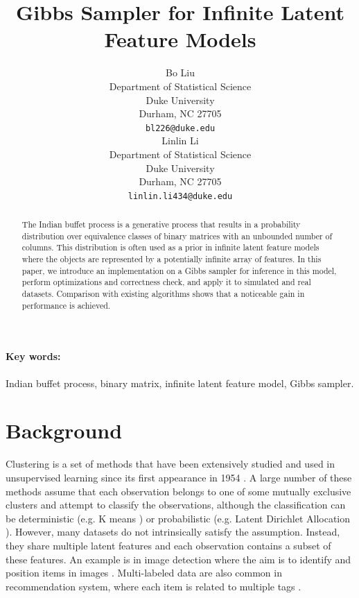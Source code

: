 \documentclass{article}
\title{Gibbs Sampler for Infinite Latent Feature Models}
\author{%
  Bo Liu \\
  Department of Statistical Science\\
  Duke University\\
  Durham, NC 27705 \\
  \texttt{bl226@duke.edu} \\
  \And
  Linlin Li \\
  Department of Statistical Science\\
  Duke University\\
  Durham, NC 27705 \\
  \texttt{linlin.li434@duke.edu} \\
}
\begin{document}
\maketitle

\begin{abstract}
  The Indian buffet process is a generative process that results in a probability distribution over equivalence classes of binary matrices with an unbounded number of columns. This distribution is often used as a prior in infinite latent feature models where the objects are represented by a potentially infinite array of features. In this paper, we introduce an implementation on a Gibbs sampler for inference in this model, perform optimizations and correctness check, and apply it to simulated and real datasets. Comparison with existing algorithms shows that a noticeable gain in performance is achieved.
\end{abstract}

\paragraph{Key words:} Indian buffet process, binary matrix, infinite latent feature model, Gibbs sampler.

\section{Background}

Clustering is a set of methods that have been extensively studied and used in unsupervised learning since its first appearance in 1954 \citep{caron2018deep}. A large number of these methods assume that each observation belongs to one of some mutually exclusive clusters and attempt to classify the observations, although the classification can be deterministic (e.g. K means \citep{steinhaus1956division, lloyd1982least}) or probabilistic (e.g. Latent Dirichlet Allocation \citep{blei2003latent}). However, many datasets do not intrinsically satisfy the assumption. Instead, they share multiple latent features and each observation contains a subset of these features. An example is in image detection where the aim is to identify and position items in images \citep{zhang2018multilabel}. Multi-labeled data are also common in recommendation system, where each item is related to multiple tags \citep{zheng2014context}.
\end{document}
